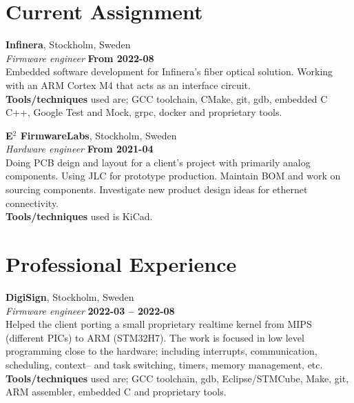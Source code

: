 \documentclass[a4paper,margin,line]{res} \usepackage{latexsym}
\begin{document}
\begin{resume}


\section{\sc Current Assignment}

{\bf Infinera}, Stockholm, Sweden\\
{\em Firmware engineer} \hfill {\bf From 2022-08}\\
Embedded software development for Infinera's fiber optical solution. 
Working with an ARM Cortex M4 that acts as an interface circuit. 
\\ {\bf Tools/techniques} used are; GCC toolchain, CMake, git, gdb, embedded C C++,
Google Test and Mock, grpc, docker and proprietary tools.

{\bf E$^2$ FirmwareLabs}, Stockholm, Sweden\\
{\em Hardware engineer} \hfill {\bf From 2021-04}\\
Doing PCB deign and layout for a client's project with primarily
analog components. Using JLC for prototype production. Maintain BOM
and work on sourcing components. Investigate new product design ideas
for ethernet connectivity.
\\ {\bf Tools/techniques} used is KiCad.

\vspace{3mm}

\section{\sc Professional Experience}

{\bf DigiSign}, Stockholm, Sweden\\
{\em Firmware engineer} \hfill {\bf 2022-03 -- 2022-08}\\
Helped the client porting a small proprietary realtime kernel from 
MIPS (different PICs) to ARM (STM32H7). The work is focused in low 
level programming close to the hardware; including interrupts, communication, 
scheduling, context-- and task switching, timers, memory management, etc.
\\ {\bf Tools/techniques} used are; GCC toolchain, gdb, Eclipse/STMCube, Make, git, 
ARM assembler, embedded C and proprietary tools.


\end{resume}
\end{document}
